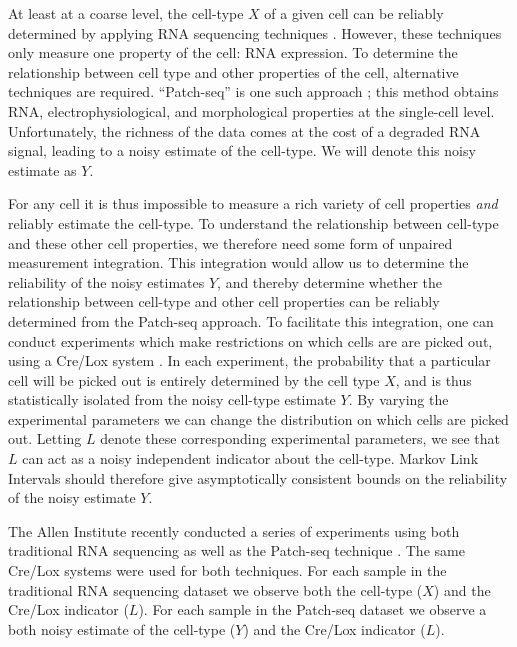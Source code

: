 \documentclass{article}
\theoremstyle{definition}
\begin{document}
At least at a coarse level, the cell-type $X$ of a given cell can be reliably determined by applying RNA sequencing techniques \cite{okaty2011cell}.  However, these techniques only measure one property of the cell: RNA expression. To determine the relationship between cell type and other properties of the cell, alternative techniques are required.  ``Patch-seq'' is one such approach \cite{cadwell2016electrophysiological}; this method obtains RNA, electrophysiological, and morphological properties at the single-cell level.  Unfortunately, the richness of the data comes at the cost of a degraded RNA signal, leading to a noisy estimate of the cell-type.  We will denote this noisy estimate as $Y$.  

For any cell it is thus impossible to measure a rich variety of cell properties \emph{and} reliably estimate the cell-type.  To understand the relationship between cell-type and these other cell properties, we therefore need some form of unpaired measurement integration.  This integration would allow us to determine the reliability of the noisy estimates $Y$, and thereby determine whether the relationship between cell-type and other cell properties can be reliably determined from the Patch-seq approach.  To facilitate this integration, one can conduct experiments which make restrictions on which cells are are picked out, using a Cre/Lox system \cite{tasic2017shared}.  In each experiment, the probability that a particular cell will be picked out is entirely determined by the cell type $X$, and is thus statistically isolated from the noisy cell-type estimate $Y$.  By varying the experimental parameters we can change the distribution on which cells are picked out.  Letting $L$ denote these corresponding experimental parameters, we see that $L$ can act as a noisy independent indicator about the cell-type.  Markov Link Intervals should therefore give asymptotically consistent bounds on the reliability of the noisy estimate $Y$.  

The Allen Institute recently conducted a series of experiments using both traditional RNA sequencing as well as the Patch-seq technique \cite{tasic2017shared}.  The same Cre/Lox systems were used for both techniques.  For each sample in the traditional RNA sequencing dataset we observe both the cell-type ($X$) and the Cre/Lox indicator ($L$).  For each sample in the Patch-seq dataset we observe a both noisy estimate of the cell-type ($Y$) and the Cre/Lox indicator ($L$).  
\end{document}
